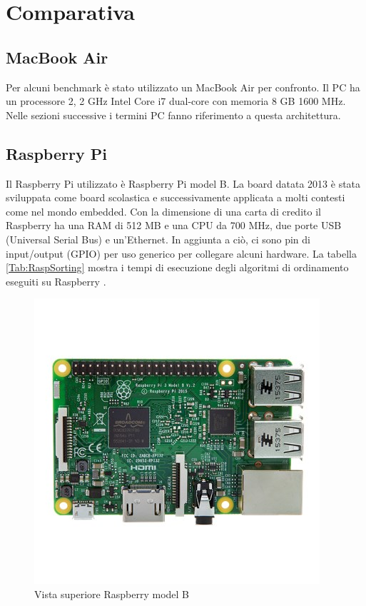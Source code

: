 \documentclass[12pt, a4paper]{report}
\begin{document}
\chapter{Comparativa}

\section*{MacBook Air}
\label{sec:MacBook}
Per alcuni benchmark è stato utilizzato un MacBook Air per confronto. Il PC ha un processore 2, 2 GHz Intel Core i7 dual-core con memoria 8 GB 1600 MHz. Nelle sezioni successive i termini PC fanno riferimento a questa architettura.

\section*{Raspberry Pi}

Il Raspberry Pi utilizzato è Raspberry Pi model B. La board datata 2013 è stata sviluppata come board scolastica e successivamente applicata a molti contesti come nel mondo embedded.
Con la dimensione di una carta di credito il Raspberry ha una RAM di 512 MB e una CPU da 700 MHz, due porte USB (Universal Serial Bus) e un'Ethernet. In aggiunta a ciò, ci sono pin di input/output (GPIO) per uso generico per collegare alcuni hardware. La tabella \ref{Tab:RaspSorting} mostra i tempi di esecuzione degli algoritmi di ordinamento eseguiti su Raspberry \cite{Rasp}.

\begin{figure}[ht]
\centering
	\includegraphics[scale=0.5 ]{RBTop.jpeg}
	\caption{Vista superiore Raspberry model B}
	\label{fig:RaspberryB}
\end{figure}
\end{document}
